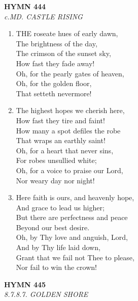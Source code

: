 \documentclass[11pt,a4paper]{article}
\begin{document}
\newpage
\begin{center}
    {\Large \textbf{HYMN 444}}
    \\
    \textit{c.MD. CASTLE RISING}
\end{center}
\vspace{1em}

\begin{enumerate}
    \item THE roseate hues of early dawn, \\
        The brightness of the day, \\
        The crimson of the sunset sky, \\
        How fast they fade away! \\
        Oh, for the pearly gates of heaven, \\
        Oh, for the golden floor, \\
        That setteth nevermore!

    \item The highest hopes we cherish here, \\
        How fast they tire and faint! \\
        How many a spot defiles the robe \\
        That wraps an earthly saint! \\
        Oh, for a heart that never sins, \\
        For robes unsullied white; \\
        Oh, for a voice to praise our Lord, \\
        Nor weary day nor night!

    \item Here faith is ours, and heavenly hope, \\
        And grace to lead us higher; \\
        But there are perfectness and peace \\
        Beyond our best desire. \\
        Oh, by Thy love and anguish, Lord, \\
        And by Thy life laid down, \\
        Grant that we fail not Thee to please, \\
        Nor fail to win the crown!

\end{enumerate}

\newpage
\begin{center}
    {\Large \textbf{HYMN 445}}
    \\
    \textit{8.7.8.7. GOLDEN SHORE}
\end{center}
\vspace{1em}
\end{document}
